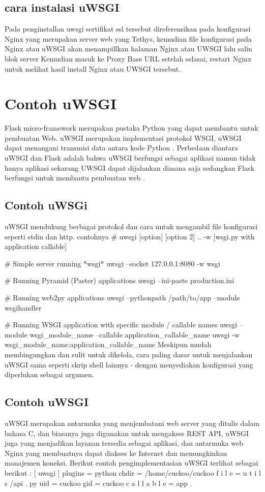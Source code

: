 \subsection {cara instalasi uWSGI}
Pada penginstallan uwsgi sertifikat ssl tersebut direferensikan pada konfigurasi Nginx yang merupakan server web yang Tethys, kemudian file konfigurasi pada Nginx atau uWSGI akan menampillkan halaman Nginx atau UWSGI lalu salin blok server Kemudian masuk ke Proxy Base URL setelah selasai, restart Nginx untuk melihat hasil install Nginx atau UWSGI tersebut\cite{pellicer2016desarrollo}.

\section{Contoh uWSGI}
Flask micro-framework merupakan pustaka Python yang dapat membantu untuk pembuatan Web. uWSGI merupakan implementasi protokol WSGI, uWSGI dapat menangani transmisi data
antara kode Python . Perbedaan diantara uWSGI dan Flask adalah bahwa uWSGI berfungsi sebagai aplikasi namun tidak hanya aplikasi sekarang UWSGI dapat dijalankan dimana saja sedangkan Flask berfungsi untuk membantu pembuatan web \cite{mulerolinked}.

\subsection{Contoh uWSGi}
uWSGI mendukung berbagai protokol dan cara untuk mengambil file  konfigurasi seperti stdin dan http. contohnya
# uwsgi [option] [option 2] .. -w [wsgi.py with application callable]

# Simple server running *wsgi*
uwsgi --socket 127.0.0.1:8080 -w wsgi

# Running Pyramid (Paster) applications
uwsgi --ini-paste production.ini

# Running web2py applications
uwsgi --pythonpath /path/to/app --module wsgihandler

# Running WSGI application with specific module / callable names
uwsgi --module wsgi_module_name --callable application_callable_name
uwsgi -w wsgi_module_name:application_callable_name
Meskipun mudah membingungkan dan sulit untuk dikelola, cara paling dasar untuk menjalankan uWSGI sama seperti skrip shell lainnya - dengan menyediakan konfigurasi yang diperlukan sebagai argumen\cite{cencini2017data}.

\subsection {Contoh uWSGI}
uWSGI merupakan antarmuka yang menjembatani web server yang ditulis dalam bahasa C, dan biasanya juga digunakan untuk mengakses REST API, uWSGI juga yang menjadikan layanan tersedia sebagai aplikasi, dan antarmuka web Nginx yang membuatnya dapat diakses ke Internet dan memungkinkan manajemen koneksi. Berikut contoh pengimplementasian uWSGI terlihat
sebagai berikut :
[ uwsgi ]
plugins = python
chdir = /home/cuckoo/cuckoo
f i l e = u t i l s /api . py
uid = cuckoo
gid = cuckoo
c a l l a b l e = app
\cite{beran2017analyza}.


